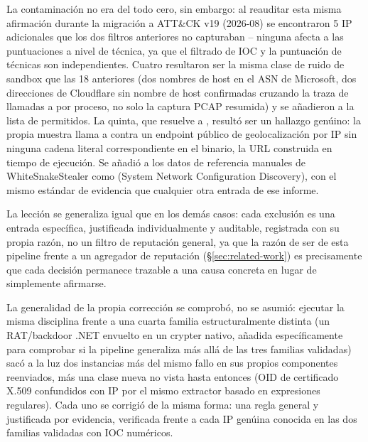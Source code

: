 La contaminaci\'on no era del todo cero, sin embargo: al reauditar
esta misma afirmaci\'on durante la migraci\'on a ATT\&CK v19 (2026-08)
se encontraron 5 IP adicionales que los dos filtros anteriores no
capturaban -- ninguna afecta a las puntuaciones a nivel de t\'ecnica,
ya que el filtrado de IOC y la puntuaci\'on de t\'ecnicas son
independientes. Cuatro resultaron ser la misma clase de ruido de
sandbox que las 18 anteriores (dos nombres de host 
en el ASN de Microsoft, dos direcciones de Cloudflare sin nombre de
host confirmadas cruzando la traza de llamadas a  por
proceso, no solo la captura PCAP resumida) y se a\~nadieron a la lista
de permitidos. La quinta, que resuelve a , result\'o
ser un hallazgo gen\'uino: la propia muestra llama a
 contra un endpoint p\'ublico de
geolocalizaci\'on por IP sin ninguna cadena literal correspondiente en
el binario, la URL construida en tiempo de ejecuci\'on. Se a\~nadi\'o a
los datos de referencia manuales de WhiteSnakeStealer como
 (System Network Configuration Discovery), con el
mismo est\'andar de evidencia que cualquier otra entrada de ese
informe.

La lecci\'on se generaliza igual que en los dem\'as casos: cada
exclusi\'on es una entrada espec\'ifica, justificada individualmente y
auditable, registrada con su propia raz\'on, no un filtro de
reputaci\'on general, ya que la raz\'on de ser de esta pipeline frente
a un agregador de reputaci\'on (\S\ref{sec:related-work}) es
precisamente que cada decisi\'on permanece trazable a una causa
concreta en lugar de simplemente afirmarse.

La generalidad de la propia correcci\'on se comprob\'o, no se
asumi\'o: ejecutar la misma disciplina frente a una cuarta familia
estructuralmente distinta (un RAT/backdoor .NET envuelto en un crypter
nativo, a\~nadida espec\'ificamente para comprobar si la pipeline
generaliza m\'as all\'a de las tres familias validadas) sac\'o a la
luz dos instancias m\'as del mismo fallo en sus propios componentes
reenviados, m\'as una clase nueva no vista hasta entonces (OID de
certificado X.509 confundidos con IP por el mismo extractor basado en
expresiones regulares). Cada uno se corrigi\'o de la misma forma: una
regla general y justificada por evidencia, verificada frente a cada IP
gen\'uina conocida en las dos familias validadas con IOC num\'ericos.
